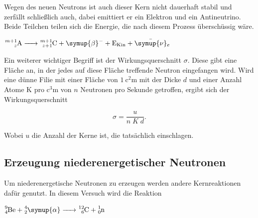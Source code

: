 Wegen des neuen Neutrons ist auch dieser Kern nicht dauerhaft stabil und zerfällt schließlich auch, dabei emittiert er ein Elektron und ein Antineutrino. 
Beide Teilchen teilen sich die Energie, die nach diesem Prozess überschüssig wäre.

$  \ce{  ^{m+1}_zA -> ^{m+1}_{z+1}C + \symup{\beta}- + E_{Kin} + \bar{\symup{\nu}}_e}   $

Ein weiterer wichtiger Begriff ist der Wirkungsquerschnitt $\sigma$. 
Diese gibt eine Fläche an, in der jedes auf diese Fläche treffende Neutron eingefangen wird.
Wird eine dünne Filie mit einer Fläche von $\SI{1}{\square\centi\meter}$ mit der Dicke $d$ und einer Anzahl Atome K pro $\si{\cubic\centi\meter}$ von $n$ Neutronen pro Sekunde getroffen, ergibt sich der Wirkungsquerschnitt 


\begin{equation}
    \sigma = \frac{u}{n \; K\; d}.
    \label{eq:sigma}
\end{equation}

Wobei $u$ die Anzahl der Kerne ist, die tatsächlich einschlagen.
%
%



\subsection{Erzeugung niederenergetischer Neutronen}
\label{ssec:t3}

Um niederenergetische Neutronen zu erzeugen werden andere Kernreaktionen dafür genutzt.
In diesem Versuch wird die Reaktion 

$\ce{^{9}_{4}Be + ^{4}_{2}\symup{\alpha} -> ^{12}_{6}C + ^{1}_0n}$

